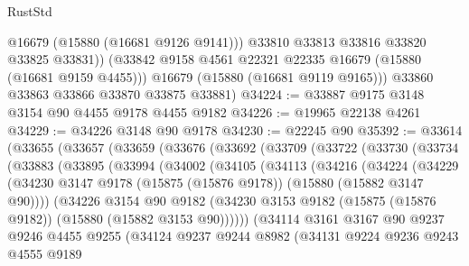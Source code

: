 \begin{lexlean}{RustStd}
\begin{coremodule}
              @16679
              (@15880 (@16681 @9126 @9141)))
            @33810
            @33813
            @33816
            @33820
            @33825
            @33831))
        (@33842 @9158 @4561 @22321 @22335 @16679 (@15880 (@16681 @9159 @4455)))
        @16679
        (@15880 (@16681 @9119 @9165)))
      @33860
      @33863
      @33866
      @33870
      @33875
      @33881)
@34224 := @33887 @9175 @3148 @3154 @90 @4455 @9178 @4455 @9182
@34226 := @19965 @22138 @4261
@34229 := @34226 @3148 @90 @9178
@34230 := @22245 @90
@35392 := @33614
    (@33655
      (@33657
        (@33659
          (@33676
            (@33692
              (@33709
                (@33722
                  (@33730
                    (@33734
                      (@33883
                        (@33895
                          (@33994
                            (@34002
                              (@34105
                                (@34113
                                  (@34216
                                    (@34224
                                      (@34229
                                        (@34230
                                          @3147
                                          @9178
                                          (@15875 (@15876 @9178))
                                          (@15880 (@15882 @3147 @90))))
                                      (@34226
                                        @3154
                                        @90
                                        @9182
                                        (@34230
                                          @3153
                                          @9182
                                          (@15875 (@15876 @9182))
                                          (@15880 (@15882 @3153 @90))))))
                                  (@34114
                                    @3161
                                    @3167
                                    @90
                                    @9237
                                    @9246
                                    @4455
                                    @9255
                                    (@34124
                                      @9237
                                      @9244
                                      @8982
                                      (@34131
                                        @9224
                                        @9236
                                        @9243
                                        @4555
                                        @9189

\end{coremodule}
\end{lexlean}
